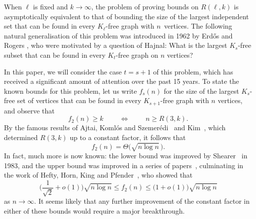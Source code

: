 \documentclass[12pt,reqno]{amsart}
\theoremstyle{remark}
\numberwithin{theorem}{section}
\renewcommand{\(}{\bigl(}
\renewcommand{\)}{\bigr)\vphantom{)}}
\renewcommand{\le}{\leqslant}
\renewcommand{\ge}{\geqslant}
\begin{document}
When $\ell$ is fixed and $k \to \infty$, the problem of proving bounds on $R(\ell,k)$ is asymptotically equivalent to that of bounding the size of the largest independent set that can be found in every $K_\ell$-free graph with $n$~vertices. The following natural generalisation of this problem was introduced in 1962 by Erd\H{o}s and Rogers \cite{ER62}, who were motivated by a question of Hajnal: What is the largest $K_s$-free subset that can be found in every $K_t$-free graph on $n$ vertices? 

In this paper, we will consider the case $t = s + 1$ of this problem, which has received a significant amount of attention over the past 15 years. To state the known bounds for this problem, let us write $f_s(n)$ for the size of the largest $K_{s}$-free set of vertices that can be found in every $K_{s+1}$-free graph with $n$ vertices, and observe that
$$f_2(n) \ge k \qquad \; \Leftrightarrow \; \qquad n \ge R(3,k).$$
By the famous results of Ajtai, Koml\'os and Szemer\'{e}di~\cite{AKSz80} and Kim~\cite{Kim95}, which determined $R(3,k)$ up to a constant factor, it follows that
$$f_2(n) = \Theta\big( \sqrt{n \log n} \, \big).$$
In fact, much more is now known: the lower bound was improved by Shearer~\cite{S83} in 1983, and the upper bound was improved in a series of papers~\cite{Boh,BK,FGM,CJMS25}, culminating in the work of Hefty, Horn, King and Pfender~\cite{HHKP25}, who showed that
\begin{equation}\label{eq:R3k:bounds}
\bigg( \frac{1}{\sqrt{2}} + o(1) \bigg) \sqrt{n \log n} \le f_2(n) \le \big( 1 + o(1) \big) \sqrt{n \log n}
\end{equation}
as $n \to \infty$. It seems likely that any further improvement of the constant factor in either of these bounds would require a major breakthrough. 
\end{document}
